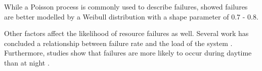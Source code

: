 \documentclass{cslthse-msc}
\begin{document}
While a Poisson process is commonly used to describe failures, \cite{studyOfFailures} showed failures are better modelled by a Weibull distribution with a shape parameter of 0.7 - 0.8.

Other factors affect the likelihood of resource failures as well. Several work has concluded a relationship between failure rate and the load of the system \cite{studyOfFailures} \cite{studyOfFailures} \cite{implicationsOfFailures}. Furthermore, studies show that failures are more likely to occur during daytime than at night \cite{implicationsOfFailures} \cite{studyOfFailures}.

\end{document}
